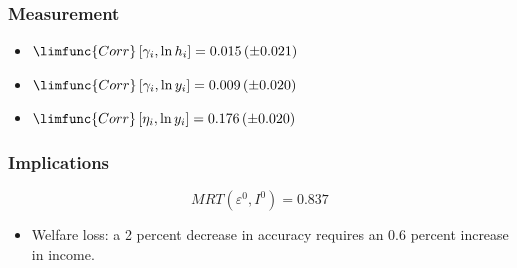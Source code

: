 \begin{frame}[allowframebreaks]%
\frametitle{Measurement}
\begin{itemize}
\item $\limfunc{Corr}\left[ \gamma _{i},\ln h_{i}\right] =0.015\left( \pm
0.021\right) $

\item $\limfunc{Corr}\left[ \gamma _{i},\ln y_{i}\right] =0.009\left( \pm
0.020\right) $

\item $\limfunc{Corr}\left[ \eta _{i},\ln y_{i}\right] =0.176\left( \pm
0.020\right) $
\end{itemize}

\end{frame}%
%

\begin{frame}[allowframebreaks]%
\frametitle{Implications}
\begin{equation*}
MRT\left( \varepsilon ^{0},I^{0}\right) =0.837
\end{equation*}%
\begin{itemize}
	\item Welfare loss: a 2 percent decrease in accuracy requires an 0.6 percent increase in income.
\end{itemize}
\end{frame}%
%





